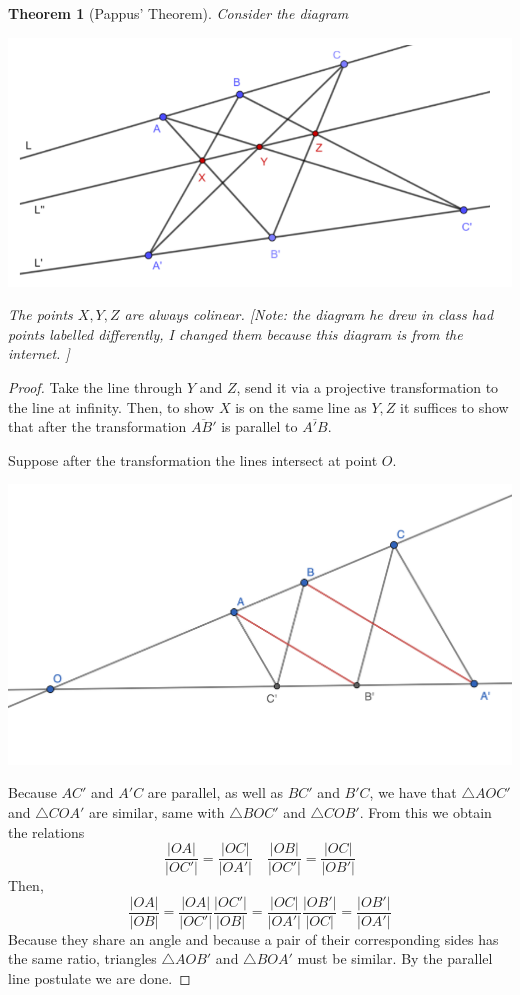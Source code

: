 \documentclass[12pt]{article}
\newtheorem{theorem}{Theorem}[section]
\begin{document}
    \begin{theorem}
        [Pappus' Theorem] Consider the diagram 
        \begin{center}
            \includegraphics[width = 0.7\linewidth]{pappus.png}
        \end{center} 
        The points $X, Y, Z$ are always colinear. [Note: the diagram he drew in class had points labelled differently, I changed them because this diagram is from the internet. ]
    \end{theorem}
    \begin{proof}
        Take the line through $Y$ and $Z$, send it via a projective transformation to the line at infinity. Then, to show $X$ is on the same line as $Y, Z$ it suffices to show that after the transformation $\overline{AB'}$ is parallel to $\overline{A'B}$.\par 
        Suppose after the transformation the lines intersect at point $O$. 
        \begin{center}
            \includegraphics[width = 0.8\linewidth]{pappus_case_2.png}
        \end{center} 
        Because $AC'$ and $A'C$ are parallel, as well as $BC'$ and $B'C$, we have that $\triangle AOC'$ and $\triangle COA'$ are similar, same with $\triangle BOC'$ and $\triangle COB'$. From this we obtain the relations
        $$\frac{|OA|}{|OC'|} = \frac{|OC|}{|OA'|} \quad \frac{|OB|}{|OC'|} = \frac{|OC|}{|OB'|}$$
        Then, 
        $$\frac{|OA|}{|OB|} = \frac{|OA|}{|OC'|}\frac{|OC'|}{|OB|} = \frac{|OC|}{|OA'|}\frac{|OB'|}{|OC|} = \frac{|OB'|}{|OA'|}$$
        Because they share an angle and because a pair of their corresponding sides has the same ratio, triangles $\triangle AOB'$ and $\triangle BOA'$ must be similar. By the parallel line postulate we are done.
    \end{proof}
\end{document}
